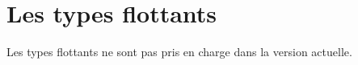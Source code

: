 




\chapter{Les types flottants}

Les types flottants ne sont pas pris en charge dans la version actuelle.